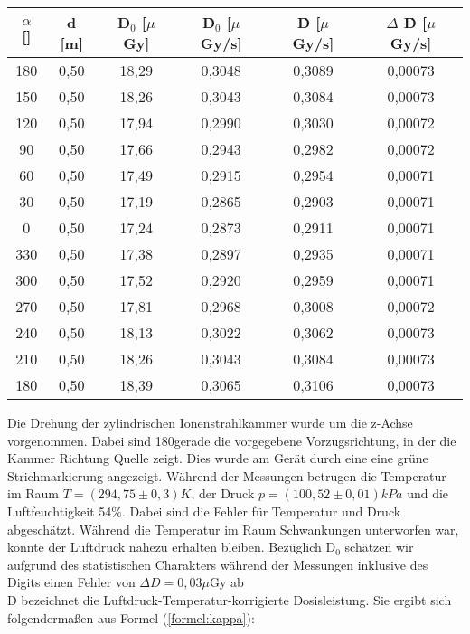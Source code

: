 \vspace{5mm}
	\begin{center}
		\begin{tabular}{c|c|c|c|c|c}
				\textbf{$\alpha$} [\textdegree] & \textbf{d} [m] & \textbf{D$_0$} [$\mu$Gy] & \textbf{\.D$_0$} [$\mu$Gy/s] & \textbf{\.D} [$\mu$ Gy/s] & $\Delta$ \textbf{\.D} [$\mu$Gy/s]\\ 
		\hline	180 & 0,50 & 18,29 & 0,3048 & 0,3089 & 0,00073 \\ 
				150 & 0,50 & 18,26 & 0,3043 & 0,3084 & 0,00073 \\ 
				120 & 0,50 & 17,94 & 0,2990 & 0,3030 & 0,00072 \\ 
				90  & 0,50 & 17,66 & 0,2943 & 0,2982 & 0,00072 \\ 
				60  & 0,50 & 17,49 & 0,2915 & 0,2954 & 0,00071 \\ 
				30  & 0,50 & 17,19 & 0,2865 & 0,2903 & 0,00071 \\ 
				0   & 0,50 & 17,24 & 0,2873 & 0,2911 & 0,00071 \\ 
				330 & 0,50 & 17,38 & 0,2897 & 0,2935 & 0,00071 \\ 
				300 & 0,50 & 17,52 & 0,2920 & 0,2959 & 0,00071 \\ 
				270 & 0,50 & 17,81 & 0,2968 & 0,3008 & 0,00072 \\ 
				240 & 0,50 & 18,13 & 0,3022 & 0,3062 & 0,00073 \\ 
			    210 & 0,50 & 18,26 & 0,3043 & 0,3084 & 0,00073 \\ 
		\hline	180 & 0,50 & 18,39 & 0,3065 & 0,3106 & 0,00073 \\ 
		\end{tabular} 
		\label{dft:Winkel}
	\end{center}
Die Drehung der zylindrischen Ionenstrahlkammer wurde um die z-Achse vorgenommen. Dabei sind 180\textdegree gerade die vorgegebene Vorzugsrichtung, in der die Kammer Richtung Quelle zeigt. Dies wurde am Gerät durch eine eine grüne Strichmarkierung angezeigt. Während der Messungen betrugen die Temperatur im Raum $T = (294,75\pm 0,3)K$, der Druck $p = (100,52 \pm 0,01)kPa$ und die Luftfeuchtigkeit 54\%. Dabei sind die Fehler für Temperatur und Druck abgeschätzt. Während die Temperatur im Raum Schwankungen unterworfen war, konnte der Luftdruck nahezu erhalten bleiben. Bezüglich D$_0$ schätzen wir aufgrund des statistischen Charakters während der Messungen inklusive des Digits einen Fehler von $\Delta D = 0,03\mu$Gy ab\\
\.D bezeichnet die Luftdruck-Temperatur-korrigierte Dosisleistung. Sie ergibt sich folgendermaßen aus Formel (\ref{formel:kappa}):

